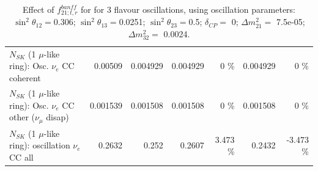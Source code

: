 \begin{table}
\begin{tabular}{| l | r | r | r  r | r  r |}
                          $N_{SK}$ (1 $\mu$-like ring): Osc. $\nu_e$ CC coherent &         0.00509 &        0.004929 &        0.004929 &        0 \%  &        0.004929 &        0 \%  \\ 
           $N_{SK}$ (1 $\mu$-like ring): Osc. $\nu_e$ CC other ($\nu_\mu$ disap) &        0.001539 &        0.001508 &        0.001508 &        0 \%  &        0.001508 &        0 \%  \\ 
                        $N_{SK}$ (1 $\mu$-like ring): oscillation $\nu_e$ CC all &          0.2632 &           0.252 &          0.2607 &    3.473 \%  &          0.2432 &   -3.473 \%  \\ 
\hline
\hline
\end{tabular}
\caption{ Effect of $f_{21; t, r}^{banff}$ for for 3 flavour oscillations, using oscillation parameters:  $\sin^2\theta_{12} = $0.306; $\sin^2\theta_{13} = $0.0251; $\sin^2\theta_{23} = $0.5; $\delta_{CP} = $        0; $\Delta m^2_{21} = $    7.5e-05; $\Delta m^2_{32} = $    0.0024. }
\label{tab:num_banff_cc1piE0_1RmuT_3f_osc_t13:0.0251}
\end{table}
\clearpage
